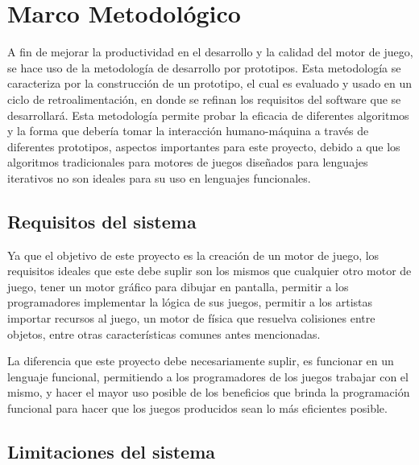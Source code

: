 
\chapter{Marco Metodológico}  %
\label{capitulo3}

\ifpdf
    \graphicspath{{metodologia/Figs/Raster/}{metodologia/Figs/PDF/}{metodologia/Figs/}}
\else
    \graphicspath{{metodologia/Figs/Vector/}{metodologia/Figs/}}
\fi

A fin de mejorar la productividad en el desarrollo y la calidad del motor de juego, se hace uso de la metodología de desarrollo por prototipos. Esta  metodología se caracteriza por la construcción de un prototipo, el cual es evaluado y usado en un ciclo de retroalimentación, en donde se refinan los requisitos del software que se desarrollará. Esta metodología permite probar la eficacia de diferentes algoritmos y la forma que debería tomar la interacción humano-máquina a través de diferentes prototipos, aspectos importantes para este proyecto, debido a que los algoritmos tradicionales para motores de juegos diseñados para lenguajes iterativos no son ideales para su uso en lenguajes funcionales.

\section{Requisitos del sistema}

Ya que el objetivo de este proyecto es la creación de un motor de juego, los requisitos ideales que este debe suplir son los mismos que cualquier otro motor de juego, tener un motor gráfico para dibujar en pantalla, permitir a los programadores implementar la lógica de sus juegos, permitir a los artistas importar recursos al juego, un motor de física que resuelva colisiones entre objetos, entre otras características comunes antes mencionadas.

La diferencia que este proyecto debe necesariamente suplir, es funcionar en un lenguaje funcional, permitiendo a los programadores de los juegos trabajar con el mismo, y hacer el mayor uso posible de los beneficios que brinda la programación funcional para hacer que los juegos producidos sean lo más eficientes posible.

\section{Limitaciones del sistema}

